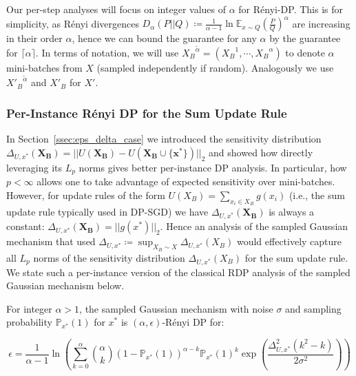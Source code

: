 Our per-step analyses will focus on integer values of $\alpha$ for R\'enyi-DP. This is for simplicity, as R\'enyi divergences $D_{\alpha}(P||Q) \coloneqq \frac{1}{\alpha -1} \ln \mathbb{E}_{x \sim Q} (\frac{P}{Q})^{\alpha}$ are increasing in their order $\alpha$, hence we can bound the guarantee for any $\alpha$ by the guarantee for $\lceil \alpha \rceil$. In terms of notation, we will use ${X_B}^{\tilde \alpha} = ({X_B}^1,\cdots,{X_B}^{\alpha})$ to denote $\alpha$ mini-batches from $X$ (sampled independently if random). Analogously we use ${X'_B}^{\tilde \alpha}$ and $X'_B$ for $X'$.


\subsubsection{Per-Instance R\'enyi DP for the Sum Update Rule}
\label{ssec:sum_update}

In Section~\ref{ssec:eps_delta_case} we introduced the sensitivity distribution $\Delta_{U,x^*}(\mathbf{X_B}) = ||U(\mathbf{X_B}) - U(\mathbf{X_B \cup \{x^*\}})||_2$ and showed how directly leveraging its $L_p$ norms gives better per-instance DP analysis. In particular, how $p < \infty$ allows one to take advantage of expected sensitivity over mini-batches. However, for update rules of the form $U(X_B) = \sum_{x_i \in X_B} g(x_i)$ (i.e., the sum update rule typically used in DP-SGD) we have $\Delta_{U,x^*}(\mathbf{X_B})$ is always a constant: $\Delta_{U,x^*}(\mathbf{X_B}) = ||g(x^*)||_2$. Hence an analysis of the sampled Gaussian mechanism that used $\Delta_{U,x^*} \coloneqq \sup_{X_B \sim X} \Delta_{U,x^*}(X_B)$ would effectively capture all $L_p$ norms of the sensitivity distribution $\Delta_{U,x^*}(X_B)$ for the sum update rule. We state such a per-instance version of the classical RDP analysis of the sampled Gaussian mechanism below.



\begin{theorem}
\label{thm:easy_renyi_dp}
    For integer $\alpha > 1$, the sampled Gaussian mechanism with noise $\sigma$ and sampling probability $\mathbb{P}_{x^*}(1)$ for $x^*$ is $(\alpha,\epsilon)$-R\'enyi DP for:

    
    $$\epsilon = \frac{1}{\alpha -1} \ln(\sum_{k=0}^{\alpha} {\alpha \choose k} (1 - \mathbb{P}_{x^*}(1))^{\alpha -k} \mathbb{P}_{x^*}(1)^k \exp(\frac{\Delta_{U,x^*}^2(k^2 - k)}{2 \sigma^2}))$$

        
\end{theorem}

